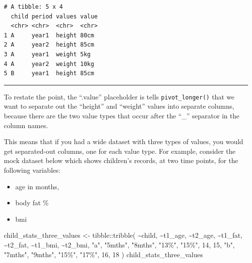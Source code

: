 \documentclass[
  letterpaper,
  DIV=11,
  numbers=noendperiod]{scrreprt}
\newenvironment{Shaded}{\begin{snugshade}}{\end{snugshade}}
\newcommand{\DecValTok}[1]{\textcolor[rgb]{0.68,0.00,0.00}{#1}}
\newcommand{\FunctionTok}[1]{\textcolor[rgb]{0.28,0.35,0.67}{#1}}
\newcommand{\NormalTok}[1]{\textcolor[rgb]{0.00,0.23,0.31}{#1}}
\newcommand{\OtherTok}[1]{\textcolor[rgb]{0.00,0.23,0.31}{#1}}
\newcommand{\SpecialCharTok}[1]{\textcolor[rgb]{0.37,0.37,0.37}{#1}}
\newcommand{\StringTok}[1]{\textcolor[rgb]{0.13,0.47,0.30}{#1}}
\providecommand{\tightlist}{%
  \setlength{\itemsep}{0pt}\setlength{\parskip}{0pt}}\usepackage{longtable,booktabs,array}
\begin{document}
\begin{verbatim}
# A tibble: 5 x 4
  child period values value
  <chr> <chr>  <chr>  <chr>
1 A     year1  height 80cm 
2 A     year2  height 85cm 
3 A     year1  weight 5kg  
4 A     year2  weight 10kg 
5 B     year1  height 85cm 
\end{verbatim}

\begin{center}\rule{0.5\linewidth}{0.5pt}\end{center}

To restate the point, the ``.value'' placeholder is tells
\texttt{pivot\_longer()} that we want to separate out the ``height'' and
``weight'' values into separate columns, because there are the two value
types that occur after the ``\_'' separator in the column names.

This means that if you had a wide dataset with three types of values,
you would get separated-out columns, one for each value type. For
example, consider the mock dataset below which shows children's records,
at two time points, for the following variables:

\begin{itemize}
\tightlist
\item
  age in months,
\item
  body fat \%
\item
  bmi
\end{itemize}

\begin{Shaded}
\begin{Highlighting}[]
\NormalTok{child\_stats\_three\_values }\OtherTok{\textless{}{-}} 
\NormalTok{  tibble}\SpecialCharTok{::}\FunctionTok{tribble}\NormalTok{(}
  \SpecialCharTok{\textasciitilde{}}\NormalTok{child,  }\SpecialCharTok{\textasciitilde{}}\NormalTok{t1\_age,  }\SpecialCharTok{\textasciitilde{}}\NormalTok{t2\_age, }\SpecialCharTok{\textasciitilde{}}\NormalTok{t1\_fat, }\SpecialCharTok{\textasciitilde{}}\NormalTok{t2\_fat, }\SpecialCharTok{\textasciitilde{}}\NormalTok{t1\_bmi, }\SpecialCharTok{\textasciitilde{}}\NormalTok{t2\_bmi,}
     \StringTok{"a"}\NormalTok{,  }\StringTok{"5mths"}\NormalTok{,  }\StringTok{"8mths"}\NormalTok{,   }\StringTok{"13\%"}\NormalTok{,   }\StringTok{"15\%"}\NormalTok{,      }\DecValTok{14}\NormalTok{,      }\DecValTok{15}\NormalTok{,}
     \StringTok{"b"}\NormalTok{,  }\StringTok{"7mths"}\NormalTok{,  }\StringTok{"9mths"}\NormalTok{,   }\StringTok{"15\%"}\NormalTok{,   }\StringTok{"17\%"}\NormalTok{,      }\DecValTok{16}\NormalTok{,      }\DecValTok{18}
\NormalTok{  )}
\NormalTok{child\_stats\_three\_values}
\end{Highlighting}
\end{Shaded}
\end{document}
